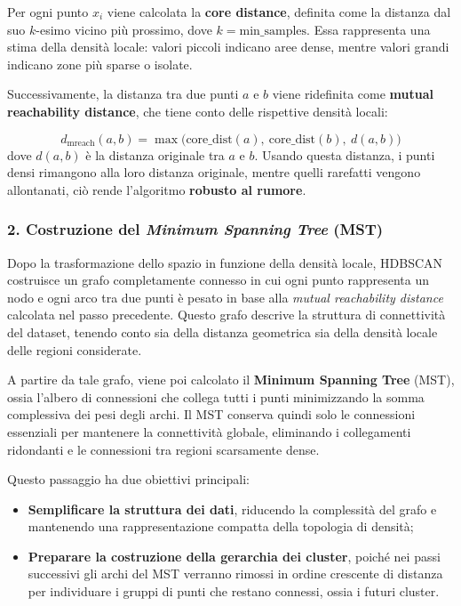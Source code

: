 Per ogni punto \( x_i \) viene calcolata la \textbf{core distance}, definita come la distanza dal suo \( k\)-esimo vicino più prossimo, dove \( k = \text{min\_samples} \). 
Essa rappresenta una stima della densità locale: valori piccoli indicano aree dense, mentre valori grandi indicano zone più sparse o isolate.

Successivamente, la distanza tra due punti \( a \) e \( b \) viene ridefinita come \textbf{mutual reachability distance}, che tiene conto delle rispettive densità locali:

\[
d_{\text{mreach}}(a,b) = \max \big( \text{core\_dist}(a),\ \text{core\_dist}(b),\ d(a,b) \big)
\]
dove $d(a,b)$ è la distanza originale tra $a$ e $b$. Usando questa distanza, i punti densi rimangono alla loro distanza originale, mentre quelli rarefatti vengono allontanati, ciò rende l'algoritmo \textbf{robusto al rumore}.
\subsubsection*{2. Costruzione del \textit{Minimum Spanning Tree} (MST)}

Dopo la trasformazione dello spazio in funzione della densità locale, HDBSCAN costruisce un grafo completamente connesso in cui ogni punto rappresenta un nodo e ogni arco tra due punti è pesato in base alla \textit{mutual reachability distance} calcolata nel passo precedente. 
Questo grafo descrive la struttura di connettività del dataset, tenendo conto sia della distanza geometrica sia della densità locale delle regioni considerate.

A partire da tale grafo, viene poi calcolato il \textbf{Minimum Spanning Tree} (MST), ossia l'albero di connessioni che collega tutti i punti minimizzando la somma complessiva dei pesi degli archi. 
Il MST conserva quindi solo le connessioni essenziali per mantenere la connettività globale, eliminando i collegamenti ridondanti e le connessioni tra regioni scarsamente dense.

Questo passaggio ha due obiettivi principali:
\begin{itemize}
    \item \textbf{Semplificare la struttura dei dati}, riducendo la complessità del grafo e mantenendo una rappresentazione compatta della topologia di densità;
    \item \textbf{Preparare la costruzione della gerarchia dei cluster}, poiché nei passi successivi gli archi del MST verranno rimossi in ordine crescente di distanza per individuare i gruppi di punti che restano connessi, ossia i futuri cluster.
\end{itemize}

